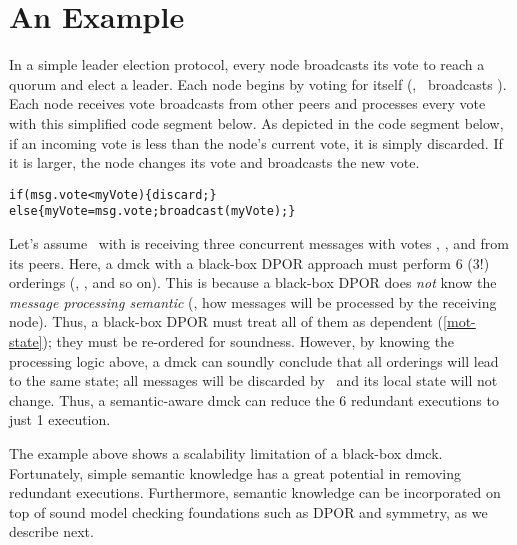 



\section{An Example}
\label{sam-ex}

In a simple leader election protocol, every node broadcasts its vote to
reach a quorum and elect a leader.  Each node begins by voting for itself
(\eg, \ntwo\ broadcasts ).  Each node receives vote broadcasts
from other peers and processes every vote with this simplified code segment
below.  As depicted in the code segment below, if an incoming vote is less
than the node's current vote, it is simply discarded.  If it is larger, the
node changes its vote and broadcasts the new vote.

{\small
\begin{alltt}
  if (msg.vote < myVote) \{discard;\} 
  else \{myVote = msg.vote; broadcast(myVote);\}
\end{alltt}}



Let's assume \nfour\ with  is receiving three concurrent
messages with votes , , and  from its peers.  Here,
a dmck with a black-box DPOR approach must perform 6 (3!) orderings
(, , and so on).  This is because a black-box DPOR
does {\em not} know the {\em message processing semantic} (\ie, how
messages will be processed by the receiving node).  Thus, a black-box
DPOR must treat all of them as dependent (\sec\ref{mot-state}); they
must be re-ordered for soundness.  However, by knowing the processing
logic above, a dmck can soundly conclude that all orderings will lead
to the same state; all messages will be discarded by \nfour\ and its local
state will not change.  Thus, a semantic-aware dmck can reduce the 6
redundant executions to just 1 execution.

The example above shows a scalability limitation of a black-box dmck.
Fortunately, simple semantic knowledge has a great potential in
removing redundant executions.  Furthermore, semantic knowledge can be
incorporated on top of sound model checking foundations such as DPOR
and symmetry, as we describe next.

